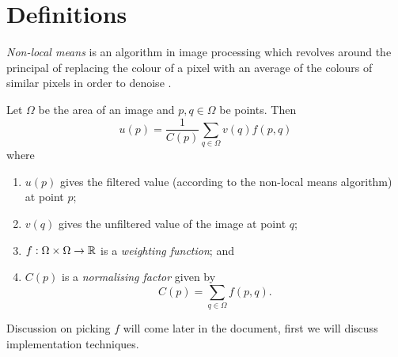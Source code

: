 \section{Definitions}

\emph{Non-local means} is an algorithm in image processing
which revolves around the principal of replacing the colour of a pixel with an average
of the colours of similar pixels in order to denoise \cite{buades2005non}.

\begin{definition}
    \label{def:non-local-means}
    Let $\Omega$ be the area of an image and $p, q \in \Omega$ be points.
    Then
    \[ u(p) = \frac1{C(p)} \sum_{q \in \Omega}v(q) f(p, q) \]
    where
    \begin{enumerate}
        \item $u(p)$ gives the filtered value
            (according to the non-local means algorithm) at point $p$;
        \item $v(q)$ gives the unfiltered value of the image at point $q$;
        \item $f: \Omega \times \Omega \to \mathbb{R}$ is a \emph{weighting function}; and
        \item $C(p)$ is a \emph{normalising factor} given by
            \[ C(p) = \sum_{q \in \Omega} f(p, q). \]
    \end{enumerate}
\end{definition}

Discussion on picking $f$ will come later in the document, first we will discuss implementation techniques.
